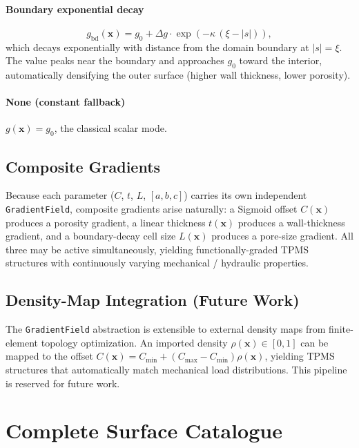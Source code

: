 \documentclass[11pt]{article}
\begin{document}
\paragraph{Boundary exponential decay}
\begin{equation}\label{eq:grad-boundary}
  g_{\text{bd}}(\mathbf{x}) = g_0 + \Delta g \cdot \exp(-\kappa\, (\xi - |s|)),
\end{equation}
which decays exponentially with distance from the domain boundary at
$|s| = \xi$.  The value peaks near the boundary and approaches $g_0$
toward the interior, automatically densifying the outer surface
(higher wall thickness, lower porosity).

\paragraph{None (constant fallback)}
$g(\mathbf{x}) = g_0$, the classical scalar mode.

\subsection{Composite Gradients}

Because each parameter ($C$, $t$, $L$, $[a,b,c]$) carries its own
independent \texttt{GradientField}, composite gradients arise
naturally: a Sigmoid offset $C(\mathbf{x})$ produces a porosity
gradient, a linear thickness $t(\mathbf{x})$ produces a wall-thickness
gradient, and a boundary-decay cell size $L(\mathbf{x})$ produces a
pore-size gradient.  All three may be active simultaneously,
yielding functionally-graded TPMS structures with continuously
varying mechanical / hydraulic properties.

\subsection{Density-Map Integration (Future Work)}

The \texttt{GradientField} abstraction is extensible to external
density maps from finite-element topology optimization.  An imported
density $\rho(\mathbf{x}) \in [0, 1]$ can be mapped to the offset
$C(\mathbf{x}) = C_{\min} + (C_{\max} - C_{\min}) \rho(\mathbf{x})$,
yielding TPMS structures that automatically match mechanical load
distributions.  This pipeline is reserved for future work.

\section{Complete Surface Catalogue}
\end{document}
